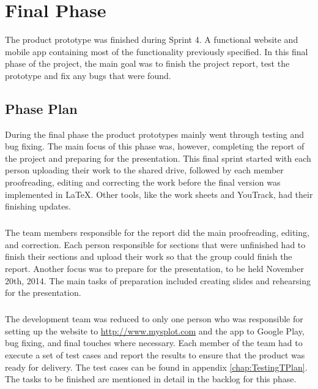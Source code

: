\chapter{Final Phase}
\label{chap:FinalPhase}

The product prototype was finished during Sprint 4. A functional website and mobile app containing most of the functionality previously specified. In this final phase of the project, the main goal was to finish the project report, test the prototype and fix any bugs that were found.

\section{Phase Plan}
\label{sec:FinalPlan}

During the final phase the product prototypes mainly went through testing and bug fixing. The main focus of this phase was, however, completing the report of the project and preparing for the presentation. This final sprint started with each person uploading their work to the shared drive, followed by each member proofreading, editing and correcting the work before the final version was implemented in LaTeX. Other tools, like the work sheets and YouTrack, had their finishing updates.

\paragraph{} The team members responsible for the report did the main proofreading, editing, and correction. Each person responsible for sections that were unfinished had to finish their sections and upload their work so that the group could finish the report. Another focus was to prepare for the presentation, to be held November 20th, 2014. The main tasks of preparation included creating slides and rehearsing for the presentation.

\paragraph{} The development team was reduced to only one person who was responsible for setting up the website to \href{www.mysplot.com}{http://www.mysplot.com} and the app to Google Play, bug fixing, and final touches where necessary. Each member of the team had to execute a set of test cases and report the results to ensure that the product was ready for delivery. The test cases can be found in appendix \ref{chap:TestingTPlan}.
The tasks to be finished are mentioned in detail in the backlog for this phase.


